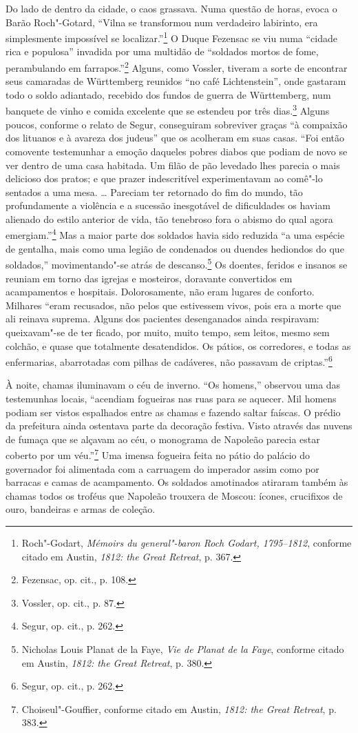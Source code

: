 Do lado de dentro da cidade, o caos grassava. Numa questão de horas,
evoca o Barão Roch"-Gotard, ``Vilna se transformou num verdadeiro
labirinto, era simplesmente impossível se localizar.''\footnote{Roch"-Godart, \textit{Mémoirs du general"-baron Roch Godart, 1795--1812}, conforme citado em Austin, \textit{1812: the Great Retreat}, p. 367.} O Duque Fezensac se viu numa ``cidade rica e populosa'' invadida por uma
multidão de ``soldados mortos de fome, perambulando em
farrapos.''\footnote{Fezensac, op. cit., p. 108.} Alguns, como Vossler,
tiveram a sorte de encontrar seus camaradas de Württemberg reunidos ``no
café Lichtenstein'', onde gastaram todo o soldo adiantado, recebido dos
fundos de guerra de Württemberg, num banquete de vinho e comida
excelente que se estendeu por três dias.\footnote{Vossler, op. cit., p. 87.} Alguns poucos, conforme o relato de Segur, conseguiram sobreviver graças ``à compaixão dos lituanos e à avareza dos judeus'' que os
acolheram em suas casas. ``Foi então comovente testemunhar a emoção
daqueles pobres diabos que podiam de novo se ver dentro de uma casa
habitada. Um filão de pão levedado lhes parecia o mais delicioso dos
pratos; e que prazer indescritível experimentavam ao comê"-lo sentados a
uma mesa. \ldots{} Pareciam ter retornado do fim do mundo, tão
profundamente a violência e a sucessão inesgotável de dificuldades os
haviam alienado do estilo anterior de vida, tão tenebroso fora o abismo
do qual agora emergiam.''\footnote{Segur, op. cit., p. 262.} Mas a maior
parte dos soldados havia sido reduzida ``a uma espécie de gentalha, mais
como uma legião de condenados ou duendes hediondos do que soldados,''
movimentando"-se atrás de descanso.\footnote{Nicholas Louis Planat de la Faye, \textit{Vie de Planat de la Faye}, conforme citado em Austin, \textit{1812: the Great Retreat}, p. 380.} Os doentes, feridos e insanos se reuniam em torno das igrejas e mosteiros, doravante convertidos em
acampamentos e hospitais. Dolorosamente, não eram lugares de conforto.
Milhares ``eram recusados, não pelos que estivessem vivos, pois era a
morte que ali reinava suprema. Alguns dos pacientes desenganados ainda
respiravam: queixavam"-se de ter ficado, por muito, muito tempo, sem
leitos, mesmo sem colchão, e quase que totalmente desatendidos. Os
pátios, os corredores, e todas as enfermarias, abarrotadas com pilhas de
cadáveres, não passavam de criptas.''\footnote{Segur, op. cit., p. 262.}

À noite, chamas iluminavam o céu de inverno. ``Os homens,'' observou uma
das testemunhas locais, ``acendiam fogueiras nas ruas para se aquecer.
Mil homens podiam ser vistos espalhados entre as chamas e fazendo saltar
faíscas. O prédio da prefeitura ainda ostentava parte da decoração
festiva. Visto através das nuvens de fumaça que se alçavam ao céu, o
monograma de Napoleão parecia estar coberto por um véu.''\footnote{Choiseul"-Gouffier, conforme citado em Austin, \textit{1812: the Great Retreat}, p. 383.} Uma imensa fogueira feita no pátio do palácio do governador foi
alimentada com a carruagem do imperador assim como por barracas e camas
de acampamento. Os soldados amotinados atiraram também às chamas todos
os troféus que Napoleão trouxera de Moscou: ícones, crucifixos de ouro,
bandeiras e armas de coleção.

